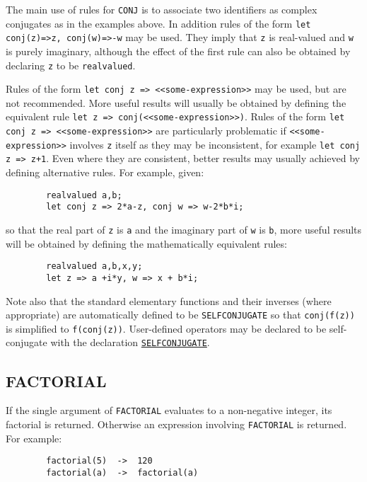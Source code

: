 The main use of rules for \texttt{CONJ} is to associate two identifiers
as complex conjugates as in the examples above. In addition rules of the form
\texttt{let conj(z)=>z, conj(w)=>-w} may be used. They imply that
\texttt{z} is real-valued and \texttt{w} is purely imaginary, although
the effect of the first rule can also be obtained by declaring \texttt{z}
to be \texttt{realvalued}.

Rules of the form \texttt{let conj z => <<some-expression>>} may be used,
but are not recommended. More useful results will usually be obtained by
defining the equivalent rule \texttt{let z => conj(<<some-expression>>)}.
Rules of the form \texttt{let conj z => <<some-expression>>} are particularly
problematic if \texttt{<<some-expression>>} involves \texttt{z} itself as
they may be inconsistent, for example \texttt{let conj z => z+1}. Even where
they are consistent, better results may usually achieved by defining alternative rules.
For example, given:
\begin{verbatim}
        realvalued a,b;
        let conj z => 2*a-z, conj w => w-2*b*i;
\end{verbatim}
so that the real part of \texttt{z} is \texttt{a} and the imaginary part
of \texttt{w} is \texttt{b}, more useful results will be obtained by
defining the mathematically equivalent rules:
\begin{verbatim}
        realvalued a,b,x,y;
        let z => a +i*y, w => x + b*i;
\end{verbatim}

Note also that the standard elementary functions and their inverses
(where appropriate) are automatically defined to be
\texttt{SELFCONJUGATE} so that
\texttt{conj(f(z))} is simplified to \texttt{f(conj(z))}. User-defined
operators may be declared to be self-conjugate with the declaration
\hyperlink{command:SELFCONJUGATE}{\texttt{SELFCONJUGATE}}.

\subsection{FACTORIAL}
\hypertarget{operator:FACTORIAL}{}

If the single argument of \texttt{FACTORIAL} evaluates to a non-negative
integer, its factorial is returned.  Otherwise an expression involving
\texttt{FACTORIAL} is returned. For example:
\begin{verbatim}
        factorial(5)  ->  120
        factorial(a)  ->  factorial(a)
\end{verbatim}

